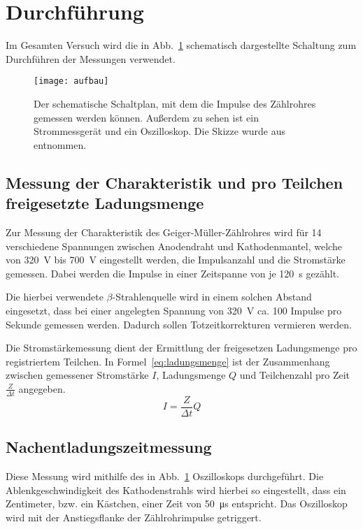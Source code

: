 
\newpage
\section{Durchführung}
%
Im Gesamten Versuch wird die in Abb.~\ref{fig:aufbau} schematisch 
dargestellte Schaltung zum Durchführen der Messungen verwendet.
%
\begin{figure}[h]
  \centering
  \texttt{[image: aufbau]}
  \caption{Der schematische Schaltplan, mit dem die Impulse
               des Zählrohres gemessen werden können. Außerdem zu sehen 
                ist ein Strommessgerät und ein Oszilloskop.
                 Die Skizze wurde aus \textcite{v703} entnommen.}
  \label{fig:aufbau}
\end{figure}
%
\subsection{Messung der Charakteristik und pro Teilchen freigesetzte Ladungsmenge}
%
Zur Messung der Charakteristik des Geiger-Müller-Zählrohres wird für 
\num{14} verschiedene Spannungen zwischen Anodendraht und 
Kathodenmantel, welche von \SI{320}{\volt} bis \SI{700}{\volt} 
eingestellt werden, die Impulsanzahl und die Stromstärke gemessen. 
Dabei werden die Impulse in einer Zeitspanne von je \SI{120}{\second} 
gezählt.

Die hierbei verwendete $\beta$-Strahlenquelle wird in einem solchen Abstand eingesetzt, 
dass bei einer angelegten Spannung von \SI{320}{\volt} ca. \num{100} Impulse pro 
Sekunde gemessen werden. Dadurch sollen Totzeitkorrekturen vermieren werden.

Die Stromstärkemessung dient der Ermittlung der freigesetzen 
Ladungsmenge pro registriertem Teilchen. In Formel~\eqref{eq:ladungsmenge} 
ist der Zusammenhang zwischen gemessener Stromstärke $I$, Ladungsmenge $Q$ 
und Teilchenzahl pro Zeit $\frac{Z}{\Delta t}$ angegeben.
\begin{equation}
I = \frac{Z}{\Delta t} Q
\label{eq:ladungsmenge}
\end{equation}
%
\subsection{Nachentladungszeitmessung}
%
Diese Messung wird mithilfe des in Abb.~\ref{fig:aufbau} Oszilloskops 
durchgeführt. Die Ablenkgeschwindigkeit des Kathodenstrahls wird hierbei 
so eingestellt, dass ein Zentimeter, bzw. ein Kästchen, einer Zeit von \SI{50}{\micro\second} 
entspricht. Das Oszilloskop wird mit der Anstiegsflanke der Zählrohrimpulse getriggert.

